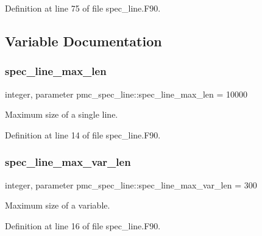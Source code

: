 Definition at line 75 of file spec\+\_\+line.\+F90.



\subsection{Variable Documentation}
\mbox{\label{namespacepmc__spec__line_ae50dbe2c181c483be6cfc87cd3a217d0}} 
\subsubsection{\texorpdfstring{spec\+\_\+line\+\_\+max\+\_\+len}{spec\_line\_max\_len}}
{\footnotesize\ttfamily integer, parameter pmc\+\_\+spec\+\_\+line\+::spec\+\_\+line\+\_\+max\+\_\+len = 10000}



Maximum size of a single line. 



Definition at line 14 of file spec\+\_\+line.\+F90.

\mbox{\label{namespacepmc__spec__line_a54f3958fcd2d7924fc1b9659e5442876}} 
\subsubsection{\texorpdfstring{spec\+\_\+line\+\_\+max\+\_\+var\+\_\+len}{spec\_line\_max\_var\_len}}
{\footnotesize\ttfamily integer, parameter pmc\+\_\+spec\+\_\+line\+::spec\+\_\+line\+\_\+max\+\_\+var\+\_\+len = 300}



Maximum size of a variable. 



Definition at line 16 of file spec\+\_\+line.\+F90.

